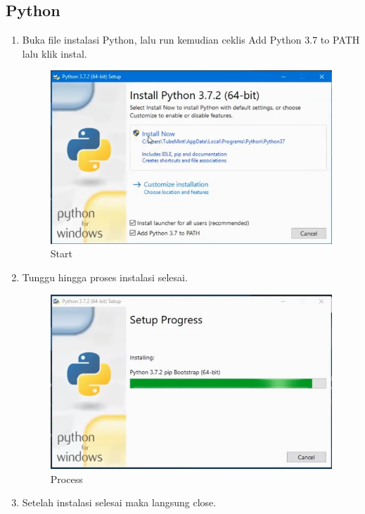 \documentclass[lipt]{Article}
\begin{document}
\subsection{Python}
\begin{enumerate}
\item
Buka file instalasi Python, lalu run kemudian ceklis Add Python 3.7 to PATH lalu klik instal.
\begin{figure}[!htbp]
\centering
\includegraphics{start.jpg}
\caption{ Start }
\label{start}
\end{figure}
\item
Tunggu hingga proses instalasi selesai.
\begin{figure}[!htbp]
\centering
\includegraphics{process.jpg}
\caption{Process}
\label{proses}
\end{figure}
\item
Setelah instalasi selesai maka langsung close.
\begin{figure}[!htbp]
\centering

\end{figure}
\end{enumerate}
\end{document}
